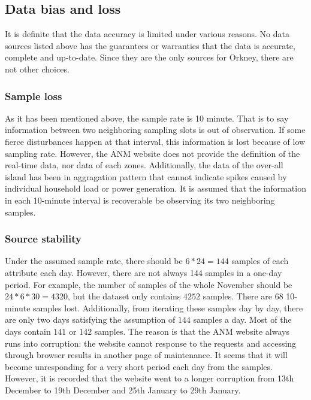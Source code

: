 \documentclass[12pt,a4paper]{report}
\begin{document}
        \subsection{Data bias and loss}
        It is definite that the data accuracy is limited under various reasons. No data sources listed above has the guarantees or warranties that the data is accurate, complete and up-to-date. 
        Since they are the only sources for Orkney, there are not other choices.

                \subsubsection{Sample loss}
                As it has been mentioned above, the sample rate is 10 minute. That is to say information between two neighboring sampling slots is out of observation.
                If some fierce disturbances happen at that interval, this information is lost because of low sampling rate. However, the ANM website does not provide
                the definition of the real-time data, nor data of each zones. Additionally, the data of the over-all island has been in aggragation pattern that cannot
                indicate spikes caused by individual household load or power generation. It is assumed that the information in each 10-minute interval is recoverable be
                observing its two neighboring samples.

                \subsubsection{Source stability}
                \label{text_source_stability}
                Under the assumed sample rate, there should be $6*24=144$ samples of each attribute each day. However, there are not always 144 samples in a one-day period.
                For example, the number of samples of the whole November should be $24*6*30=4320$, but the dataset only contains $4252$ samples. There are $68$ 10-minute samples
                lost. Additionally, from iterating these samples day by day, there are only two days satisfying the assumption of $144$ samples a day. Most of the days contain
                $141$ or $142$ samples. The reason is that the ANM website always runs into corruption: the website cannot response to the requests and accessing through browser results
                in another page of maintenance. It seems that it will become unresponding for a very short period each day from the samples. However, it is recorded that the website
                went to a longer corruption from 13th December to 19th December and 25th January to 29th January.
\end{document}
